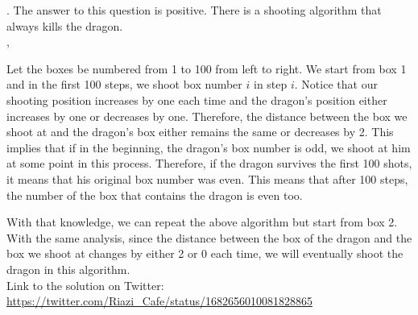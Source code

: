 \begin{solution}.
The answer to this question is positive. There is a shooting algorithm that always kills the dragon. \\[0.2cm], 

Let the boxes be numbered from 1 to 100 from left to right. We start from box 1 and in the first 100 steps, we shoot box number $i$ in step $i$. Notice that our shooting position increases by one each time and the dragon's position either increases by one or decreases by one. Therefore, the distance between the box we shoot at and the dragon's box either remains the same or decreases by 2. This implies that if in the beginning, the dragon's box number is odd, we shoot at him at some point in this process. Therefore, if the dragon survives the first 100 shots, it means that his original box number was even. This means that after 100 steps, the number of the box that contains the dragon is even too.

With that knowledge, we can repeat the above algorithm but start from box 2. With the same analysis, since the distance between the box of the dragon and the box we shoot at changes by either 2 or 0 each time, we will eventually shoot the dragon in this algorithm.\\[0.2cm]

Link to the solution on Twitter:  \url{https://twitter.com/Riazi_Cafe/status/1682656010081828865}\end{solution}